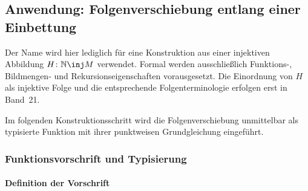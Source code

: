\documentclass[main.tex]{subfiles}
\begin{document}
\begin{tabproof}



\end{tabproof}
\subsection{Anwendung: Folgenverschiebung entlang einer Einbettung}

Der Name wird hier lediglich für eine Konstruktion aus einer injektiven
Abbildung \(H\colon\mathbb N\inj M\) verwendet. Formal werden ausschließlich
Funktions-, Bildmengen- und Rekursionseigenschaften vorausgesetzt. Die
Einordnung von \(H\) als injektive Folge und die entsprechende
Folgenterminologie erfolgen erst in Band~21.

Im folgenden Konstruktionsschritt wird die Folgenverschiebung unmittelbar
als typisierte Funktion mit ihrer punktweisen Grundgleichung eingeführt.

\subsubsection{Funktionsvorschrift und Typisierung}

\paragraph{Definition der Vorschrift}
\end{document}
